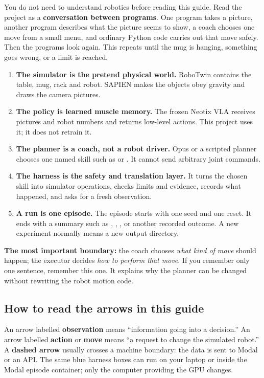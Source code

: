 \documentclass[11pt,a4paper]{article}
\newcommand{\code}[1]{\texttt{\detokenize{#1}}}
\begin{document}
\begin{eli5}
You do not need to understand robotics before reading this guide. Read the project as a
\textbf{conversation between programs}. One program takes a picture, another program describes
what the picture seems to show, a coach chooses one move from a small menu, and ordinary Python
code carries out that move safely. Then the programs look again. This repeats until the mug is
hanging, something goes wrong, or a limit is reached.
\end{eli5}

\begin{enumerate}[leftmargin=*,itemsep=6pt]
  \item \textbf{The simulator is the pretend physical world.} RoboTwin contains the table, mug,
        rack and robot. SAPIEN makes the objects obey gravity and draws the camera pictures.
  \item \textbf{The policy is learned muscle memory.} The frozen Neotix VLA receives pictures and
        robot numbers and returns low-level actions. This project uses it; it does not retrain it.
  \item \textbf{The planner is a coach, not a robot driver.} Opus or a scripted planner chooses
        one named skill such as \code{vla_act} or \code{move_to}. It cannot send arbitrary joint
        commands.
  \item \textbf{The harness is the safety and translation layer.} It turns the chosen skill into
        simulator operations, checks limits and evidence, records what happened, and asks for a
        fresh observation.
  \item \textbf{A run is one episode.} The episode starts with one seed and one reset. It ends
        with a summary such as \code{task_success}, \code{abort}, \code{step_budget}, or another
        recorded outcome. A new experiment normally means a new output directory.
\end{enumerate}

\begin{keyidea}
\textbf{The most important boundary:} the coach chooses \emph{what kind of move} should happen;
the executor decides \emph{how to perform that move}. If you remember only one sentence, remember
this one. It explains why the planner can be changed without rewriting the robot motion code.
\end{keyidea}

\subsection*{How to read the arrows in this guide}
An arrow labelled \textbf{observation} means ``information going into a decision.'' An arrow
labelled \textbf{action} or \textbf{move} means ``a request to change the simulated robot.'' A
\textbf{dashed arrow} usually crosses a machine boundary: the data is sent to Modal or an API.
The same blue harness boxes can run on your laptop or inside the Modal episode container; only
the computer providing the GPU changes.
\end{document}
